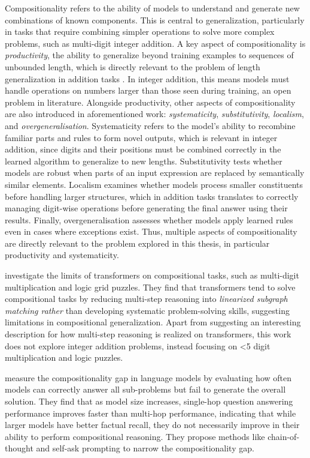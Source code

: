 Compositionality refers to the ability of models to understand and generate new combinations of known components. This is central to generalization, particularly in tasks that require combining simpler operations to solve more complex problems, such as multi-digit integer addition. A key aspect of compositionality is \emph{productivity}, the ability to generalize beyond training examples to sequences of unbounded length, which is directly relevant to the problem of length generalization in addition tasks \cite{hupkes_compositionality_2020}. In integer addition, this means models must handle operations on numbers larger than those seen during training, an open problem in literature. Alongside productivity, other aspects of compositionality are also introduced in aforementioned work: \emph{systematicity}, \emph{substitutivity}, \emph{localism}, and \emph{overgeneralisation}. Systematicity refers to the model's ability to recombine familiar parts and rules to form novel outputs, which is relevant in integer addition, since digits and their positions must be combined correctly in the learned algorithm to generalize to new lengths. Substitutivity tests whether models are robust when parts of an input expression are replaced by semantically similar elements. Localism examines whether models process smaller constituents before handling larger structures, which in addition tasks translates to correctly managing digit-wise operations before generating the final answer using their results. Finally, overgeneralisation assesses whether models apply learned rules even in cases where exceptions exist. Thus, multiple aspects of compositionality are directly relevant to the problem explored in this thesis, in particular productivity and systematicity.

\cite{dziri_faith_2023} investigate the limits of transformers on compositional tasks, such as multi-digit multiplication and logic grid puzzles. They find that transformers tend to solve compositional tasks by reducing multi-step reasoning into \emph{linearized subgraph matching rather} than developing systematic problem-solving skills, suggesting limitations in compositional generalization. Apart from suggesting an interesting description for how multi-step reasoning is realized on transformers, this work does not explore integer addition problems, instead focusing on <5 digit multiplication and logic puzzles.

\cite{press_measuring_2023} measure the compositionality gap in language models by evaluating how often models can correctly answer all sub-problems but fail to generate the overall solution. They find that as model size increases, single-hop question answering performance improves faster than multi-hop performance, indicating that while larger models have better factual recall, they do not necessarily improve in their ability to perform compositional reasoning. They propose methods like chain-of-thought and self-ask prompting to narrow the compositionality gap.


